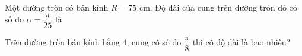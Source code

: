 \begin{bt}%

	Một đường tròn có bán kính $R=75$ cm. Độ dài của cung trên đường tròn đó có số đo $\alpha =\dfrac{\pi}{25}$ là 
\end{bt}

\begin{bt}%

	Trên đường tròn bán kính bằng $4$, cung có số đo $\dfrac{\pi}{8}$ thì có độ dài là bao nhiêu? 
\end{bt}
